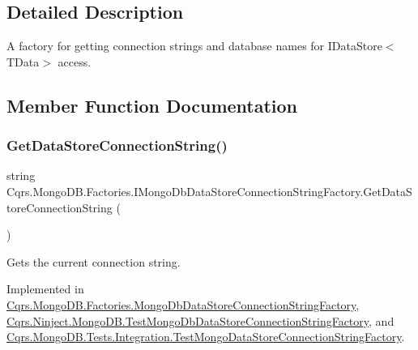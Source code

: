 \subsection{Detailed Description}
A factory for getting connection strings and database names for I\+Data\+Store$<$\+T\+Data$>$ access. 



\subsection{Member Function Documentation}
\mbox{\label{interfaceCqrs_1_1MongoDB_1_1Factories_1_1IMongoDbDataStoreConnectionStringFactory_a31cb87fb2cf1435912f635394494ed91_a31cb87fb2cf1435912f635394494ed91}} 
\subsubsection{\texorpdfstring{Get\+Data\+Store\+Connection\+String()}{GetDataStoreConnectionString()}}
{\footnotesize\ttfamily string Cqrs.\+Mongo\+D\+B.\+Factories.\+I\+Mongo\+Db\+Data\+Store\+Connection\+String\+Factory.\+Get\+Data\+Store\+Connection\+String (\begin{DoxyParamCaption}{ }\end{DoxyParamCaption})}



Gets the current connection string. 



Implemented in \hyperlink{classCqrs_1_1MongoDB_1_1Factories_1_1MongoDbDataStoreConnectionStringFactory_a76986fcc9521c87bfbb6e417ef13cd53_a76986fcc9521c87bfbb6e417ef13cd53}{Cqrs.\+Mongo\+D\+B.\+Factories.\+Mongo\+Db\+Data\+Store\+Connection\+String\+Factory}, \hyperlink{classCqrs_1_1Ninject_1_1MongoDB_1_1TestMongoDbDataStoreConnectionStringFactory_abc9f81219c65af4182635cd545282b65_abc9f81219c65af4182635cd545282b65}{Cqrs.\+Ninject.\+Mongo\+D\+B.\+Test\+Mongo\+Db\+Data\+Store\+Connection\+String\+Factory}, and \hyperlink{classCqrs_1_1MongoDB_1_1Tests_1_1Integration_1_1TestMongoDataStoreConnectionStringFactory_a520a0722aa91ed6144e4e86213ea13da_a520a0722aa91ed6144e4e86213ea13da}{Cqrs.\+Mongo\+D\+B.\+Tests.\+Integration.\+Test\+Mongo\+Data\+Store\+Connection\+String\+Factory}.

